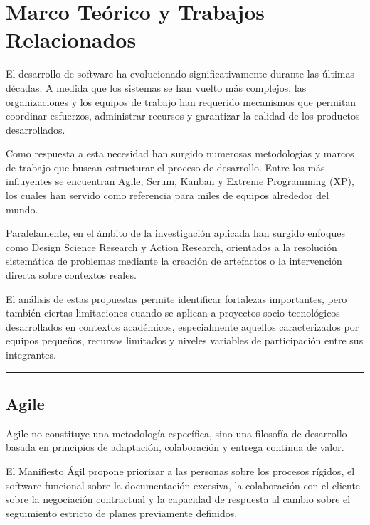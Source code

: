 \documentclass[14pt,a4paper,oneside]{extbook}
\begin{document}
\chapter{Marco Teórico y Trabajos Relacionados}


El desarrollo de software ha evolucionado significativamente durante las últimas décadas. A medida que los sistemas se han vuelto más complejos, las organizaciones y los equipos de trabajo han requerido mecanismos que permitan coordinar esfuerzos, administrar recursos y garantizar la calidad de los productos desarrollados.

Como respuesta a esta necesidad han surgido numerosas metodologías y marcos de trabajo que buscan estructurar el proceso de desarrollo. Entre los más influyentes se encuentran Agile, Scrum, Kanban y Extreme Programming (XP), los cuales han servido como referencia para miles de equipos alrededor del mundo.

Paralelamente, en el ámbito de la investigación aplicada han surgido enfoques como Design Science Research y Action Research, orientados a la resolución sistemática de problemas mediante la creación de artefactos o la intervención directa sobre contextos reales.

El análisis de estas propuestas permite identificar fortalezas importantes, pero también ciertas limitaciones cuando se aplican a proyectos socio-tecnológicos desarrollados en contextos académicos, especialmente aquellos caracterizados por equipos pequeños, recursos limitados y niveles variables de participación entre sus integrantes.

\par\vspace{1.5em}\noindent\hfill\rule{0.25\textwidth}{0.6pt}\hfill\par\vspace{1.5em}

\section{Agile}

Agile no constituye una metodología específica, sino una filosofía de desarrollo basada en principios de adaptación, colaboración y entrega continua de valor.

El Manifiesto Ágil propone priorizar a las personas sobre los procesos rígidos, el software funcional sobre la documentación excesiva, la colaboración con el cliente sobre la negociación contractual y la capacidad de respuesta al cambio sobre el seguimiento estricto de planes previamente definidos.
\end{document}
